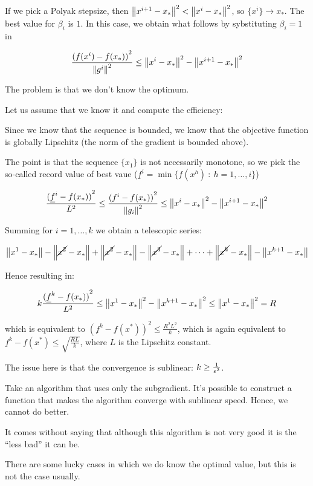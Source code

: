\documentclass[ComputationalMathematics.tex]{subfiles}
\begin{document}
If we pick a Polyak stepsize, then ${\left\lVert x^{i+1} - x_*\right\rVert}^2 < {\left\lVert x^i  - x_*\right\rVert}^2$, so $\{x^i \} \to x_*$.
The best value for $\beta_i$ is $1$.
In this case, we obtain what follows by sybstituting $\beta_i = 1$ in 

\[
  \frac{{(f(x^i) - f(x_*))}^2}{{\left\lVert g^i\right\rVert}^2} \le {\left\lVert x^i - x_*\right\rVert}^2 - {\left\lVert x^{i+1} - x_*\right\rVert}^2
\]

The problem is that we don't know the optimum.

Let us assume that we know it and compute the efficiency:

Since we know that the sequence is bounded, we know that the objective function is globally Lipschitz (the norm of the gradient is bounded above).

The point is that the sequence $\{ x_1 \}$ is not necessarily monotone, so we pick the so-called record value of best vaue ($\underline{f}^i = \min \{ f(x^h)~:~h=1, \ldots, i\}$)

\[
  \frac{{(\underline{f}^i - f(x_*))}^2}{L^2} \le \frac{{({f}^i - f(x_*))}^2}{{\left\lVert g_i\right\rVert}^2} \le {\left\lVert x^i - x_*\right\rVert}^2 - {\left\lVert x^{i+1} - x_*\right\rVert}^2
\]

Summing for $i=1, \ldots, k$ we obtain a telescopic series:

\[
  \left\lVert x^1 - x_*\right\rVert - \left\lVert\cancel{x^2} - x_*\right\rVert + \left\lVert\cancel{x^2} - x_*\right\rVert - \left\lVert\cancel{x^3} - x_*\right\rVert + \cdots + \left\lVert\cancel{x^k} - x_*\right\rVert - \left\lVert x^{k+1} - x_*\right\rVert
\]

Hence resulting in:

\[
  k \frac{{(\underline{f}^k - f(x_*))}^2}{L^2} \le {\left\lVert x^1 - x_*\right\rVert}^2 - {\left\lVert x^{k+1} - x_*\right\rVert}^2 \le {\left\lVert x^1 - x_*\right\rVert}^2 = R
\]

which is equivalent to ${(\underline{f}^k - f(x^*))}^2 \le \frac{R^2L^2}{k}$, which is again equivalent to $\underline{f}^k - f(x^*) \le \sqrt{\frac{RL}{k}}$, where $L$ is the Lipschitz constant.

The issue here is that the convergence is sublinear: $k \ge \frac{1}{{\varepsilon}^2}$.


\begin{theorem}
Take an algorithm that uses only the subgradient. It's possible to construct a function that makes the algorithm converge with sublinear speed.
Hence, we cannot do better.
\end{theorem}

It comes without saying that although this algorithm is not very good it is the ``less bad'' it can be.

There are some lucky cases in which we do know the optimal value, but this is not the case usually.
\end{document}
